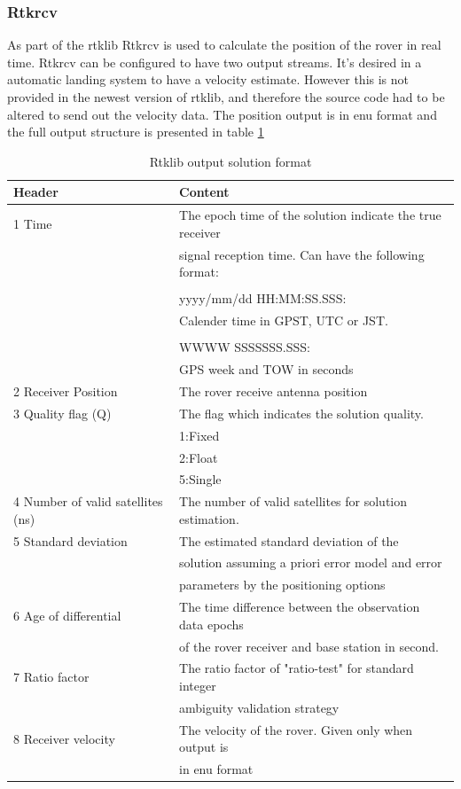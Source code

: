 \subsubsection{Rtkrcv}
As part of the \gls{rtklib} Rtkrcv is  used to calculate the position of the rover in real time.
Rtkrcv can be configured to have two output streams. It's desired in a automatic landing system to have a velocity estimate. However this is not provided in the newest version of \gls{rtklib}, and therefore the source code had to be altered to send out the velocity data. The position output is in \gls{enu} format and the full output structure is presented in table \ref{Tb:RtklibOutput}
\begin{table}[H]
\begin{center}
    \begin{tabular}{ | l | l |}
    \hline
    \textbf{Header} & \textbf{Content} \\ \hline
     1 Time & The epoch time of the solution indicate the true receiver\\& signal reception time. Can have the following format:\\&\\& yyyy/mm/dd HH:MM:SS.SSS:\\& Calender time in GPST, UTC or JST.\\&\\&
     
     WWWW SSSSSSS.SSS:\\&
     GPS week and TOW in seconds  \\ \hline
     2 Receiver Position & The rover receive antenna position \\ \hline
     3 Quality flag (Q) & The flag which indicates the solution quality.\\& 1:Fixed\\& 2:Float\\& 5:Single \\ \hline
     4 Number of valid satellites (ns) & The number of valid satellites for solution estimation. \\ \hline
     5 Standard deviation & The estimated standard deviation of the\\& solution assuming a priori error model and error\\& parameters by the positioning options \\ \hline
     6 Age of differential & The time difference between the observation data epochs\\& of the rover receiver and base station in second. \\ \hline
     7 Ratio factor & The ratio factor of "ratio-test" for standard integer\\& ambiguity validation strategy \\ \hline
     8 Receiver velocity & The velocity of the rover. Given only when output is\\& in enu format \\ \hline
    \end{tabular}
\end{center}
\caption{Rtklib output solution format }
\label{Tb:RtklibOutput}
\end{table}


